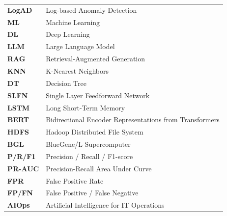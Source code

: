 \documentclass[12pt,a4paper,oneside]{report}
\begin{document}
\begin{tabular}{ll}
\textbf{LogAD} & Log-based Anomaly Detection \\
\textbf{ML} & Machine Learning \\
\textbf{DL} & Deep Learning \\
\textbf{LLM} & Large Language Model \\
\textbf{RAG} & Retrieval-Augmented Generation \\
\textbf{KNN} & K-Nearest Neighbors \\
\textbf{DT} & Decision Tree \\
\textbf{SLFN} & Single Layer Feedforward Network \\
\textbf{LSTM} & Long Short-Term Memory \\
\textbf{BERT} & Bidirectional Encoder Representations from Transformers \\
\textbf{HDFS} & Hadoop Distributed File System \\
\textbf{BGL} & BlueGene/L Supercomputer \\
\textbf{P/R/F1} & Precision / Recall / F1-score \\
\textbf{PR-AUC} & Precision-Recall Area Under Curve \\
\textbf{FPR} & False Positive Rate \\
\textbf{FP/FN} & False Positive / False Negative \\
\textbf{AIOps} & Artificial Intelligence for IT Operations \\
\end{tabular}

\newpage
{}



% 
% 
% 
% 

\newpage



% 
\end{document}
